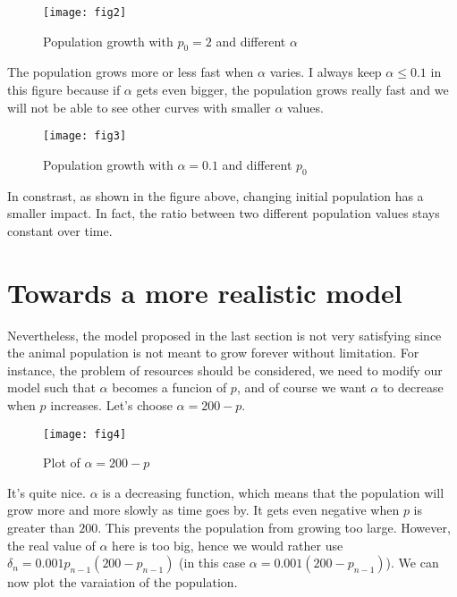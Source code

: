 \vspace{-1em}
\begin{figure}[H]
  \centering
  \texttt{[image: fig2]}
  \caption{Population growth with $p_0 = 2$ and different $\alpha$}
\end{figure}

The population grows more or less fast when $\alpha$ varies. I always keep
$\alpha \le 0.1$ in this figure because if $\alpha$ gets even bigger, the 
population grows really fast and we will not be able to see other curves
with smaller $\alpha$ values.

\vspace{-1em}
\begin{figure}[H]
  \centering
  \texttt{[image: fig3]}
  \caption{Population growth with $\alpha = 0.1$ and different $p_0$}
\end{figure}

In constrast, as shown in the figure above, changing initial population has 
a smaller impact. In fact, the ratio between two different population values
stays constant over time.

\section{Towards a more realistic model}

Nevertheless, the model proposed in the last section is not very satisfying
since the animal population is not meant to grow forever without limitation.
For instance, the problem of resources should be considered, we need to 
modify our model such that $\alpha$ becomes a funcion of $p$, and of course
we want $\alpha$ to decrease when $p$ increases. Let's choose 
$\alpha = 200 - p$.

\vspace{-1em}
\begin{figure}[H]
  \centering
  \texttt{[image: fig4]}
  \caption{Plot of $\alpha = 200 - p$}
\end{figure}

It's quite nice. $\alpha$ is a decreasing function, which means that the 
population will grow more and more slowly as time goes by. It gets even
negative when $p$ is greater than $200$. This prevents the population
from growing too large. However, the real value of $\alpha$ here is too big, 
hence we would rather use $\delta_n = 0.001p_{n-1}(200 - p_{n-1})$ 
(in this case $\alpha = 0.001(200-p_{n-1})$). We can now plot the 
varaiation of the population.


